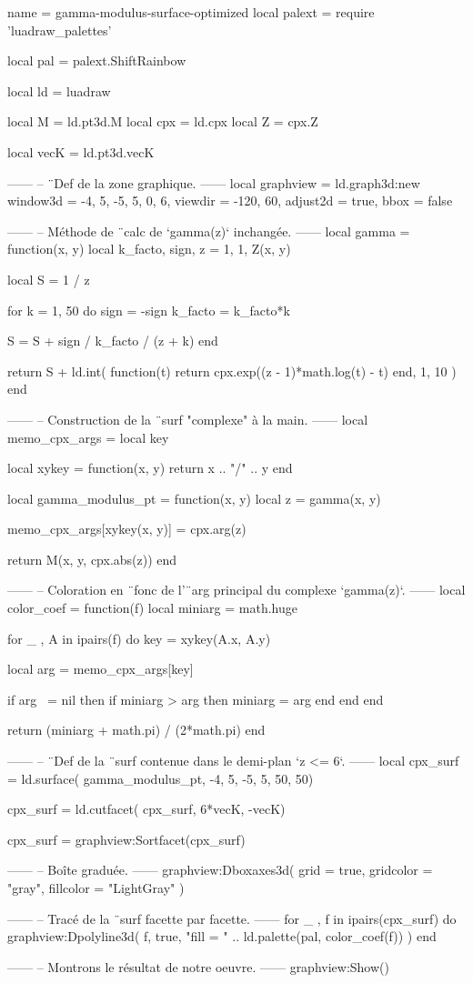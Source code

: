 \documentclass[border = 3pt]{standalone}
\begin{document}
\begin{luadraw}{name = gamma-modulus-surface-optimized}
local palext = require 'luadraw_palettes'

local pal = palext.ShiftRainbow

local ld = luadraw

local M   = ld.pt3d.M
local cpx = ld.cpx
local Z   = cpx.Z

local vecK = ld.pt3d.vecK

------
-- ¨Def de la zone graphique.
------
local graphview = ld.graph3d:new{
  window3d = {-4, 5, -5, 5, 0, 6},
  viewdir  = {-120, 60},
  adjust2d = true,
  bbox     = false
}

------
-- Méthode de ¨calc de `gamma(z)` inchangée.
------
local gamma = function(x, y)
  local k_facto, sign, z = 1, 1, Z(x, y)

  local S = 1 / z

  for k = 1, 50 do
    sign    = -sign
    k_facto = k_facto*k

    S = S + sign / k_facto / (z + k)
  end

  return S + ld.int(
    function(t)
      return cpx.exp((z - 1)*math.log(t) - t)
    end,
    1, 10
  )
end

------
-- Construction de la ¨surf "complexe" à la main.
------
local memo_cpx_args = {}
local key

local xykey = function(x, y)
    return x .. "/" .. y
end

local gamma_modulus_pt = function(x, y)
  local z = gamma(x, y)

  memo_cpx_args[xykey(x, y)] = cpx.arg(z)

  return M(x, y, cpx.abs(z))
end

------
-- Coloration en ¨fonc de l'¨arg principal du complexe `gamma(z)`.
------
local color_coef = function(f)
  local miniarg = math.huge

  for _ , A in ipairs(f) do
    key = xykey(A.x, A.y)

    local arg = memo_cpx_args[key]

    if arg ~= nil then
      if miniarg > arg then
        miniarg = arg
      end
    end
  end

  return (miniarg + math.pi) / (2*math.pi)
end

------
-- ¨Def de la ¨surf contenue dans le demi-plan `z <= 6`.
------
local cpx_surf = ld.surface(
  gamma_modulus_pt,
  -4, 5, -5, 5,
  {50, 50})

cpx_surf = ld.cutfacet(
  cpx_surf,
  {6*vecK, -vecK})

cpx_surf = graphview:Sortfacet(cpx_surf)

------
-- Boîte graduée.
------
graphview:Dboxaxes3d({
  grid      = true,
  gridcolor = "gray",
  fillcolor = "LightGray"
})

------
-- Tracé de la ¨surf facette par facette.
------
for _ , f in ipairs(cpx_surf) do
  graphview:Dpolyline3d(
    f,
    true,
       "fill = "
    .. ld.palette(pal, color_coef(f))
  )
end

------
-- Montrons le résultat de notre oeuvre.
------
graphview:Show()
\end{luadraw}
\end{document}
